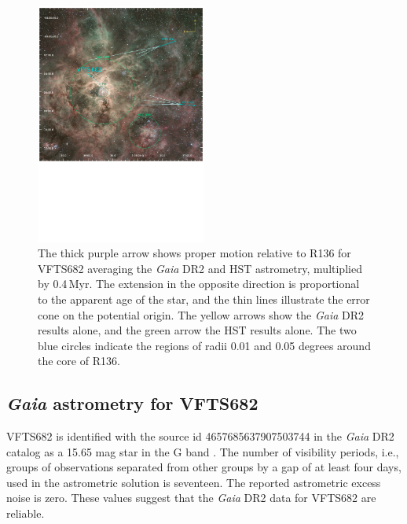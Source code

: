 \documentclass[a4paper,fleqn,usenatbib]{mnras}
\begin{document}
\begin{figure}%
  \centering
  \includegraphics[width=0.5\textwidth]{./figures/fig2}  
  \caption{The thick purple arrow shows proper motion
    relative to R136 for VFTS682 averaging the \emph{Gaia} DR2 and HST
  astrometry, multiplied by 0.4\,Myr. The extension in the opposite
  direction is proportional to the apparent age of the star, and the
  thin lines illustrate the error cone on the potential origin. The
  yellow arrows show the \emph{Gaia} DR2 results alone, and the green
  arrow the HST results alone. The two blue circles indicate the regions of radii 0.01 and 0.05
   degrees around the core of R136.}  
  \label{fig:main}
\end{figure}

\vspace*{-20pt}
\subsection{ \emph{Gaia} astrometry for VFTS682\label{data:gaia}}


VFTS682 is identified with the source id 4657685637907503744 in the
\emph{Gaia} DR2 catalog %
  as a 15.65 mag star in the G band
\citep{gaia:16,brown:18}.   The number of visibility periods,
i.e., groups of observations separated from other groups by a gap of at
least four days, used in the astrometric solution is seventeen. The reported astrometric excess noise is zero.  These values
suggest that the \emph{Gaia} DR2  data for VFTS682 are
reliable.
\end{document}
